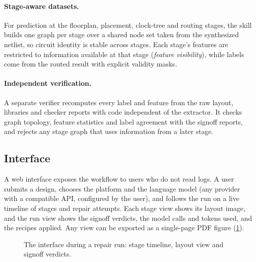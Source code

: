 \paragraph{Stage-aware datasets.}
For prediction at the floorplan, placement, clock-tree and routing stages, the skill builds one graph
per stage over a shared node set taken from the synthesized netlist, so circuit identity is stable
across stages. Each stage's features are restricted to information available at that stage
(\emph{feature visibility}), while labels come from the routed result with explicit validity masks.

\paragraph{Independent verification.}
A separate verifier recomputes every label and feature from the raw layout, libraries and checker
reports with code independent of the extractor. It checks graph topology, feature statistics and
label agreement with the signoff reports, and rejects any stage graph that uses information from a
later stage.

\subsection{Interface}
\label{sec:skill-gui}
A web interface exposes the workflow to users who do not read logs. A user submits a design,
chooses the platform and the language model (any provider with a compatible API, configured by the
user), and follows the run on a live timeline of stages and repair attempts. Each stage view shows
its layout image, and the run view shows the signoff verdicts, the model calls and tokens used, and
the recipes applied. Any view can be exported as a single-page PDF figure (\cref{fig:ui}).

\begin{figure}[t]
  \centering
  \caption{The \R interface during a repair run: stage timeline, layout view and signoff verdicts.
  }
  \label{fig:ui}
\end{figure}
